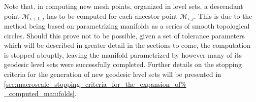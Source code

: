 Note that, in computing new mesh points, organized in level sets, a descendant
point $\mathcal{M}_{i+1,j}$ has to be computed for each ancestor point
$\mathcal{M}_{i,j}$. This is due to the method being based on parametrizing
manifolds as a series of smooth topological circles. Should this prove
not to be possible, given a set of tolerance parameters which will be
described in greater detail in the sections to come, the computation is stopped
abruptly, leaving the manifold parametrized by however many of its
geodesic level sets were successfully completed. Further details on the
stopping criteria for the generation of new geodesic level sets will be
presented in \cref{sec:macroscale_stopping_criteria_for_the_expansion_of%
_computed_manifolds}.
